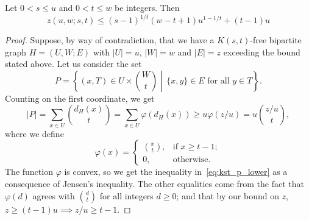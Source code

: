 \begin{theorem} \label{thm:kst} %
    Let $0 < s \leq u$ and $0 < t \leq w$ be integers.
    Then
    \[z(u, w; s, t) \leq (s - 1)^{1 / t}(w - t + 1)u^{1 - 1 / t} + (t - 1)u\]
    \begin{proof}
        Suppose, by way of contradiction, that we have a $K(s, t)$-free bipartite graph $H = (U, W; E)$
        with $|U| = u$, $|W| = w$ and $|E| = z$ exceeding the bound stated above.
        Let us consider the set
        \[
            P = \left\{ (x, T) \in U \times \binom{W}{t}
            \middle\vert\, \{x, y\} \in E \text{ for all } y \in T \right\}.
        \]
        Counting on the first coordinate, we get
        \begin{equation} \label{eq:kst_p_lower}
            |P| =
            \sum_{x \in U} \binom{d_H(x)}{t} =
            \sum_{x \in U} \varphi(d_H(x)) \geq
            u \varphi(z/u) =
            u \binom{z / u}{t},
        \end{equation}
        where we define
        \[
            \varphi(x) =
            \begin{cases}
                \binom{x}{t}, & \text{if } x \geq t - 1; \\
                0, & \text{otherwise.}
            \end{cases}
        \]
        The function $\varphi$ is convex, so we get the inequality in~\eqref{eq:kst_p_lower}
        as a consequence of Jensen's inequality.
        The other equalities come from the fact that $\varphi(d)$ agrees
        with $\binom{d}{t}$ for all integers $d \geq 0$;
        and that by our bound on $z$, $z \geq (t-1)u \implies z/u \geq t - 1$.


\end{proof}
\end{theorem}
